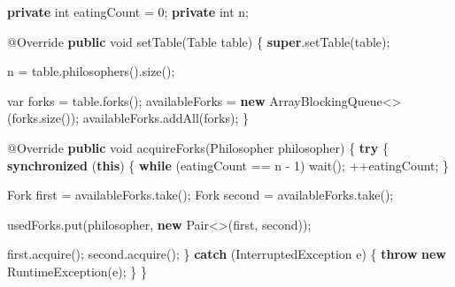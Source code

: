 \documentclass[11pt]{article}
\newenvironment{Shaded}{}{}
\newcommand{\KeywordTok}[1]{\textcolor[rgb]{0.00,0.44,0.13}{\textbf{{#1}}}}
\newcommand{\DataTypeTok}[1]{\textcolor[rgb]{0.56,0.13,0.00}{{#1}}}
\newcommand{\DecValTok}[1]{\textcolor[rgb]{0.25,0.63,0.44}{{#1}}}
\newcommand{\FunctionTok}[1]{\textcolor[rgb]{0.02,0.16,0.49}{{#1}}}
\newcommand{\NormalTok}[1]{{#1}}
\newcommand{\ControlFlowTok}[1]{\textcolor[rgb]{0.00,0.44,0.13}{\textbf{{#1}}}}
\newcommand{\OperatorTok}[1]{\textcolor[rgb]{0.40,0.40,0.40}{{#1}}}
\newcommand{\BuiltInTok}[1]{{#1}}
\newcommand{\AttributeTok}[1]{\textcolor[rgb]{0.49,0.56,0.16}{{#1}}}
\begin{document}
\begin{Shaded}
\begin{Highlighting}[]
    \KeywordTok{private} \DataTypeTok{int}\NormalTok{ eatingCount }\OperatorTok{=} \DecValTok{0}\OperatorTok{;}
    \KeywordTok{private} \DataTypeTok{int}\NormalTok{ n}\OperatorTok{;}

    \AttributeTok{@Override}
    \KeywordTok{public} \DataTypeTok{void} \FunctionTok{setTable}\OperatorTok{(}\NormalTok{Table table}\OperatorTok{)} \OperatorTok{\{}
        \KeywordTok{super}\OperatorTok{.}\FunctionTok{setTable}\OperatorTok{(}\NormalTok{table}\OperatorTok{);}

\NormalTok{        n }\OperatorTok{=}\NormalTok{ table}\OperatorTok{.}\FunctionTok{philosophers}\OperatorTok{().}\FunctionTok{size}\OperatorTok{();}

        \DataTypeTok{var}\NormalTok{ forks }\OperatorTok{=}\NormalTok{ table}\OperatorTok{.}\FunctionTok{forks}\OperatorTok{();}
\NormalTok{        availableForks }\OperatorTok{=} \KeywordTok{new} \BuiltInTok{ArrayBlockingQueue}\OperatorTok{\textless{}\textgreater{}(}\NormalTok{forks}\OperatorTok{.}\FunctionTok{size}\OperatorTok{());}
\NormalTok{        availableForks}\OperatorTok{.}\FunctionTok{addAll}\OperatorTok{(}\NormalTok{forks}\OperatorTok{);}
    \OperatorTok{\}}

    \AttributeTok{@Override}
    \KeywordTok{public} \DataTypeTok{void} \FunctionTok{acquireForks}\OperatorTok{(}\NormalTok{Philosopher philosopher}\OperatorTok{)} \OperatorTok{\{}
        \ControlFlowTok{try} \OperatorTok{\{}
            \KeywordTok{synchronized} \OperatorTok{(}\KeywordTok{this}\OperatorTok{)} \OperatorTok{\{}
                \ControlFlowTok{while} \OperatorTok{(}\NormalTok{eatingCount }\OperatorTok{==}\NormalTok{ n }\OperatorTok{{-}} \DecValTok{1}\OperatorTok{)}
                    \FunctionTok{wait}\OperatorTok{();}
                \OperatorTok{++}\NormalTok{eatingCount}\OperatorTok{;}
            \OperatorTok{\}}

\NormalTok{            Fork first }\OperatorTok{=}\NormalTok{ availableForks}\OperatorTok{.}\FunctionTok{take}\OperatorTok{();}
\NormalTok{            Fork second }\OperatorTok{=}\NormalTok{ availableForks}\OperatorTok{.}\FunctionTok{take}\OperatorTok{();}

\NormalTok{            usedForks}\OperatorTok{.}\FunctionTok{put}\OperatorTok{(}\NormalTok{philosopher}\OperatorTok{,} \KeywordTok{new}\NormalTok{ Pair}\OperatorTok{\textless{}\textgreater{}(}\NormalTok{first}\OperatorTok{,}\NormalTok{ second}\OperatorTok{));}

\NormalTok{            first}\OperatorTok{.}\FunctionTok{acquire}\OperatorTok{();}
\NormalTok{            second}\OperatorTok{.}\FunctionTok{acquire}\OperatorTok{();}
        \OperatorTok{\}} \ControlFlowTok{catch} \OperatorTok{(}\BuiltInTok{InterruptedException}\NormalTok{ e}\OperatorTok{)} \OperatorTok{\{}
            \ControlFlowTok{throw} \KeywordTok{new} \BuiltInTok{RuntimeException}\OperatorTok{(}\NormalTok{e}\OperatorTok{);}
        \OperatorTok{\}}
    \OperatorTok{\}}


\end{Highlighting}
\end{Shaded}
\end{document}
